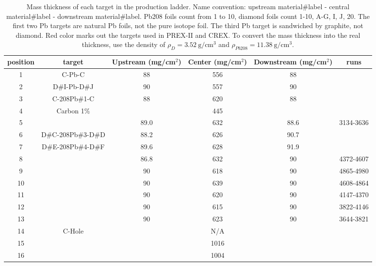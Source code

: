 \begin{table}[!h]
    \centering
    \begin{tabular}{c | c | c c c c}
	\hline
	position    & target& \makecell{Upstream \\ (mg/cm${}^2$)}    & \makecell{Center \\ (mg/cm${}^2$)}     & \makecell{Downstream \\ (mg/cm${}^2$)}   & runs  \\
	\hline
	1   & C-Pb-C	    & 88    & 556   & 88    & \\
	2   & D\#I-Pb-D\#J      & 90    & 557   & 90    & \\
	\hline
	3   & C-208Pb\#1-C    & 88    & 620   & 88    & \\
	4   & Carbon 1\%    &       & 445   &	    & \\
	\hline
	5   & \color{red}{D\#A-208Pb\#2-D\#B}  & 89.0  & 632   & 88.6  & 3134-3636 \\
	6   & D\#C-208Pb\#3-D\#D  & 88.2  & 626   & 90.7  & \\
	7   & D\#E-208Pb\#4-D\#F  & 89.6  & 628   & 91.9  & \\
	8   & \color{red}{D\#G-208Pb\#5-D\#20} & 86.8  & 632   & 90    & 4372-4607 \\
	9   & \color{red}{D\#1-208Pb\#6-D\#2}  & 90    & 618   & 90    & 4865-4980 \\
	10  & \color{red}{D\#3-208Pb\#7-D\#4}  & 90    & 639   & 90    & 4608-4864 \\
	11  & \color{red}{D\#5-208Pb\#8-D\#6}  & 90    & 620   & 90    & 4147-4370 \\
	12  & \color{red}{D\#7-208Pb\#9-D\#8}  & 90    & 615   & 90    & 3822-4146 \\
	13  & \color{red}{D\#9-208Pb\#10-D\#10}& 90    & 623   & 90    & 3644-3821 \\
	\hline
	14  & C-Hole	    &       & N/A   &       & \\
	15  & \color{red}{\Ca}	    &       & 1016  &       & \\
	16  & \ca	    &       & 1004  &       & \\
	\hline
    \end{tabular}
    \caption{Mass thickness of each target in the production ladder. 
    Name convention: upstream material\#label - central material\#label - downstream material\#label. 
    Pb208 foils count from 1 to 10, diamond foils count 1-10, A-G, I, J, 20. 
    The first two Pb targets are natural Pb foils, not the pure \Pb isotope foil. 
    The third Pb target is sandwiched by graphite, not diamond. Red color marks
    out the targets used in PREX-II and CREX. To convert the mass thickness into 
    the real thickness, use the density of $\rho_D = 3.52\ \mathrm{g}/\mathrm{cm}^3$ 
    and $\rho_{Pb208} = 11.38 \ \mathrm{g}/\mathrm{cm}^3$.}
    \label{tab:target_thickness}
\end{table}

